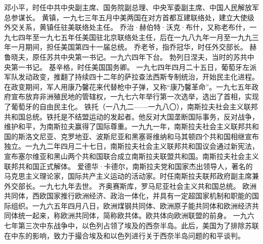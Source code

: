 \begin{maonote}
邓小平，时任中共中央副主席、国务院副总理、中央军委副主席、中国人民解放军总参谋长。
黄镇，一九七三年五月中美两国在对方首都互建联络处，建立大使级外交关系，黄镇任驻美联络处主任。
乔治·赫伯特·沃克·布什，又称老布什，一九七四年至一九七五年任美国驻北京联络处主任，后在一九八九年一月至一九九三年一月期间，担任美国第四十一届总统。
乔老爷，指乔冠华，时任外交部长。
赫鲁晓夫，原任苏共中央第一书记。一九六四年下台。
勃列日涅夫，当时的苏共中央第一书记。
基辛格，时任美国国务卿。
一九七四年四月二十五日，葡萄牙左派军队发动政变，推翻了持续四十二年的萨拉查法西斯专制统治，开始民主化进程。在政变期间，军人用康乃馨花来代替枪中子弹，又称“康乃馨革命”。一九七五年政府宣布放弃非洲殖民地的管辖权，一九七六年举行第一次选举，选出了首相，实现了葡萄牙的自由民主化。
铁托（一八九二——一九八〇），南斯拉夫社会主义联邦共和国总统。铁托是不结盟运动的发起者。他反对大国垄断国际事务，反对战争，维护和平，为南斯拉夫赢得了国际尊重。一九九一年，南斯拉夫社会主义联邦共和国的斯洛文尼亚、克罗地亚、波斯尼亚和黑塞哥维纳和马其顿四个共和国相继宣布独立。一九九二年四月二十七日，南斯拉夫社会主义联邦共和国议会通过新宪法，宣布塞尔维亚和黑山两个共和国联合成立南斯拉夫联盟共和国。南斯拉夫社会主义联邦共和国正式解体。
爱德华·卡德尔，南斯拉夫党和国家杰出领导人，著名的马克思主义理论家，国际共产主义运动的活动家。时任南斯拉夫联邦政府副主席兼外交部长。一九七九年去世。
齐奥赛斯库，罗马尼亚社会主义共和国总统。
欧洲共同体，西欧国家推行欧洲经济、政治一体化，并具有一定超国家机制和职能的国际组织。一九六五年四月八日，欧洲煤钢共同体、欧洲原子能共同体和欧洲经济共同体统一起来，称欧洲共同体，简称欧共体。欧共体向欧洲联盟的前身。
一九六七年第三次中东战争中，以色列占领了埃及的西奈半岛。此后，美国为了排除苏联在中东的影响，致力于撮合埃及和以色列进行关于西奈半岛问题的和平谈判。


\end{maonote}
